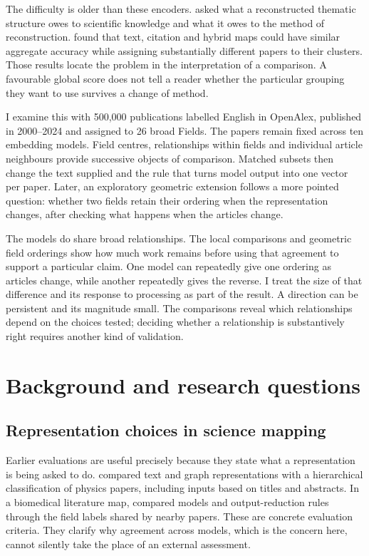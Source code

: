 \documentclass[12pt]{article}
\begin{document}
The difficulty is older than these encoders. \citet{refa0d2d707e6} asked what a reconstructed thematic structure owes to scientific knowledge and what it owes to the method of reconstruction. \citet{ref6a2f5912bc} found that text, citation and hybrid maps could have similar aggregate accuracy while assigning substantially different papers to their clusters. Those results locate the problem in the interpretation of a comparison. A favourable global score does not tell a reader whether the particular grouping they want to use survives a change of method.

I examine this with 500,000 publications labelled English in OpenAlex, published in 2000--2024 and assigned to 26 broad Fields. The papers remain fixed across ten embedding models. Field centres, relationships within fields and individual article neighbours provide successive objects of comparison. Matched subsets then change the text supplied and the rule that turns model output into one vector per paper. Later, an exploratory geometric extension follows a more pointed question: whether two fields retain their ordering when the representation changes, after checking what happens when the articles change.

The models do share broad relationships. The local comparisons and geometric field orderings show how much work remains before using that agreement to support a particular claim. One model can repeatedly give one ordering as articles change, while another repeatedly gives the reverse. I treat the size of that difference and its response to processing as part of the result. A direction can be persistent and its magnitude small. The comparisons reveal which relationships depend on the choices tested; deciding whether a relationship is substantively right requires another kind of validation.

\section{Background and research questions}
\subsection{Representation choices in science mapping}
Earlier evaluations are useful precisely because they state what a representation is being asked to do. \citet{refc0e2cc29e0} compared text and graph representations with a hierarchical classification of physics papers, including inputs based on titles and abstracts. In a biomedical literature map, \citet{refbe130e2973} compared models and output-reduction rules through the field labels shared by nearby papers. These are concrete evaluation criteria. They clarify why agreement across models, which is the concern here, cannot silently take the place of an external assessment.
\end{document}
